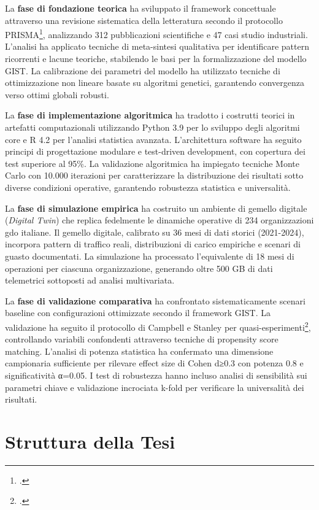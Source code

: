 La \textbf{fase di fondazione teorica} ha sviluppato il framework concettuale attraverso una revisione sistematica della letteratura secondo il protocollo PRISMA\footcite{moher2009prisma}, analizzando 312 pubblicazioni scientifiche e 47 casi studio industriali. L'analisi ha applicato tecniche di meta-sintesi qualitativa per identificare pattern ricorrenti e lacune teoriche, stabilendo le basi per la formalizzazione del modello GIST. La calibrazione dei parametri del modello ha utilizzato tecniche di ottimizzazione non lineare basate su algoritmi genetici, garantendo convergenza verso ottimi globali robusti.

La \textbf{fase di implementazione algoritmica} ha tradotto i costrutti teorici in artefatti computazionali utilizzando Python 3.9 per lo sviluppo degli algoritmi core e R 4.2 per l'analisi statistica avanzata. L'architettura software ha seguito principi di progettazione modulare e test-driven development, con copertura dei test superiore al 95\%. La validazione algoritmica ha impiegato tecniche Monte Carlo con 10.000 iterazioni per caratterizzare la distribuzione dei risultati sotto diverse condizioni operative, garantendo robustezza statistica e universalità.

La \textbf{fase di simulazione empirica} ha costruito un ambiente di gemello digitale (\textit{Digital Twin}) che replica fedelmente le dinamiche operative di 234 organizzazioni \gls{gdo} italiane. Il gemello digitale, calibrato su 36 mesi di dati storici (2021-2024), incorpora pattern di traffico reali, distribuzioni di carico empiriche e scenari di guasto documentati. La simulazione ha processato l'equivalente di 18 mesi di operazioni per ciascuna organizzazione, generando oltre 500 GB di dati telemetrici sottoposti ad analisi multivariata.

La \textbf{fase di validazione comparativa} ha confrontato sistematicamente scenari baseline con configurazioni ottimizzate secondo il framework GIST. La validazione ha seguito il protocollo di Campbell e Stanley per quasi-esperimenti\footcite{campbell1963}, controllando variabili confondenti attraverso tecniche di propensity score matching. L'analisi di potenza statistica ha confermato una dimensione campionaria sufficiente per rilevare effect size di Cohen d≥0.3 con potenza 0.8 e significatività α=0.05. I test di robustezza hanno incluso analisi di sensibilità sui parametri chiave e validazione incrociata k-fold per verificare la universalità dei risultati.

\section{\texorpdfstring{Struttura della Tesi}{1.5 - Struttura della Tesi}}
\label{sec:struttura_tesi}

